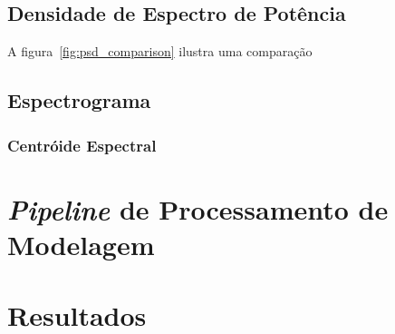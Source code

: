 \subsection{Densidade de Espectro de Potência}

A figura~\ref{fig:psd_comparison} ilustra uma comparação


\subsection{Espectrograma}

\subsubsection{Centróide Espectral}


\section{\emph{Pipeline} de Processamento de Modelagem}



\section{Resultados}

